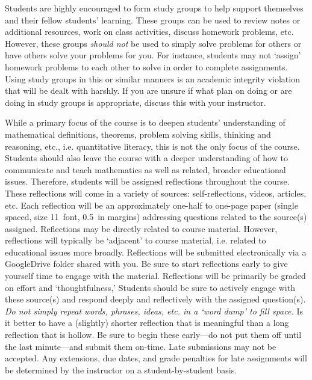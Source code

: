 \documentclass[11pt,letterpaper]{article}
\begin{document}
Students are highly encouraged to form study groups to help support themselves and their fellow students' learning. These groups can be used to review notes or additional resources, work on class activities, discuss homework problems, etc. However, these groups {\itshape should not} be used to simply solve problems for others or have others solve your problems for you. For instance, students may not `assign' homework problems to each other to solve in order to complete assignments. Using study groups in this or similar manners is an academic integrity violation that will be dealt with harshly. If you are unsure if what plan on doing or are doing in study groups is appropriate, discuss this with your instructor. \sectionbreak



While a primary focus of the course is to deepen students' understanding of mathematical definitions, theorems, problem solving skills, thinking and reasoning, etc., i.e. quantitative literacy, this is not the only focus of the course. Students should also leave the course with a deeper understanding of how to communicate and teach mathematics as well as related, broader educational issues. Therefore, students will be assigned reflections throughout the course. These reflections will come in a variety of sources: self-reflections, videos, articles, etc. Each reflection will be an approximately one-half to one-page paper (single spaced, size 11~font, 0.5~in margins) addressing questions related to the source(s) assigned. Reflections may be directly related to course material. However, reflections will typically be `adjacent' to course material, i.e. related to educational issues more broadly. Reflections will be submitted electronically via a GoogleDrive folder shared with you. Be sure to start reflections early to give yourself time to engage with the material. Reflections will be primarily be graded on effort and `thoughtfulness,' Students should be sure to actively engage with these source(s) and respond deeply and reflectively with the assigned question(s). \textit{Do not simply repeat words, phrases, ideas, etc. in a `word dump' to fill space.} Is it better to have a (slightly) shorter reflection that is meaningful than a long reflection that is hollow. Be sure to begin these early---do not put them off until the last minute---and submit them on-time. Late submissions may not be accepted. Any extensions, due dates, and grade penalties for late assignments will be determined by the instructor on a student-by-student basis. \sectionbreak 
\end{document}
